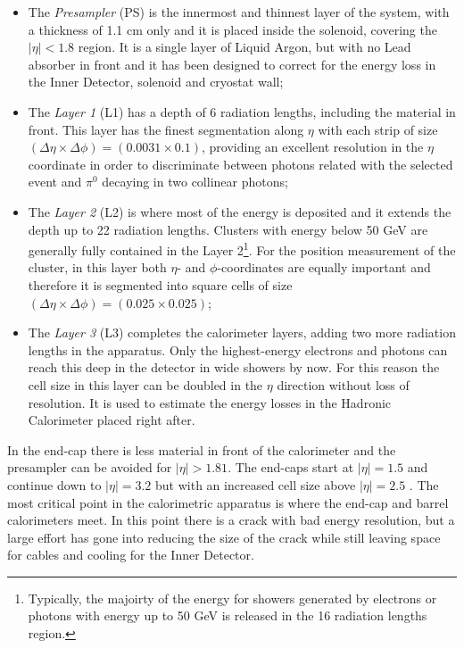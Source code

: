\begin{itemize}
\item The \emph{Presampler} (PS) is the innermost and thinnest layer of the system, with a thickness of 1.1 cm only and it is placed inside the solenoid, covering the $|\eta| < 1.8$ region. It is a single layer of Liquid Argon, but with no Lead absorber in front and it has been designed to correct for the energy loss in the Inner Detector, solenoid and cryostat wall;
\item The \emph{Layer 1} (L1) has a depth of 6 radiation lengths, including the material in front. This layer has the finest segmentation along $\eta$ with each strip of size $(\Delta \eta \times \Delta \phi) = (0.0031 \times 0.1)$, providing an excellent resolution in the $\eta$ coordinate in order to discriminate between photons related with the selected event and  $\pi^0$ decaying in two collinear photons;
\item The \emph{Layer 2} (L2) is where most of the energy is deposited and it extends the depth up to 22 radiation lengths. Clusters with energy below 50 GeV are generally fully contained in the Layer 2\footnote{Typically, the majoirty of the energy for showers generated by electrons or photons with energy up to 50 GeV is released in the 16 radiation lengths region.}. For the position measurement of the cluster, in this layer both $\eta$- and $\phi$-coordinates are equally important and therefore it is segmented into square cells of size $(\Delta \eta \times \Delta \phi) = (0.025 \times 0.025)$;
\item The \emph{Layer 3} (L3) completes the calorimeter layers, adding two more radiation lengths in the apparatus. Only the highest-energy electrons and photons can reach this deep in the detector in wide showers by now. For this reason the cell size in this layer can be doubled in the $\eta$ direction without loss of resolution. It is used to estimate the energy losses in the Hadronic Calorimeter placed right after.
\end{itemize}
In the end-cap there is less material in front of the calorimeter and the presampler can be avoided for $|\eta| > 1.81$. The end-caps start at $|\eta| = 1.5$ and continue down to $|\eta| = 3.2$ but with an increased cell size above $|\eta| = 2.5$ . The most critical point in the calorimetric apparatus is where the end-cap and barrel calorimeters meet. In this point there is a crack with bad energy resolution, but a large effort has gone into reducing the size of the crack while still leaving space for cables and cooling for the Inner Detector.
